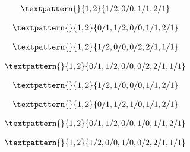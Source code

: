 \begin{equation}
	\begin{gathered}
		\textpattern{}{1,2}{1/2,0/0,1/1,2/1}
	\end{gathered}
	\label{cls:55}
\end{equation}

\begin{equation}
	\begin{gathered}
		\textpattern{}{1,2}{0/1,1/2,0/0,1/1,2/1}
	\end{gathered}
	\label{cls:56}
\end{equation}

\begin{equation}
	\begin{gathered}
		\textpattern{}{1,2}{1/2,0/0,0/2,2/1,1/1}
	\end{gathered}
	\label{cls:57}
\end{equation}

\begin{equation}
	\begin{gathered}
		\textpattern{}{1,2}{0/1,1/2,0/0,0/2,2/1,1/1}
	\end{gathered}
	\label{cls:58}
\end{equation}

\begin{equation}
	\begin{gathered}
		\textpattern{}{1,2}{1/2,1/0,0/0,1/1,2/1}
	\end{gathered}
	\label{cls:59}
\end{equation}

\begin{equation}
	\begin{gathered}
		\textpattern{}{1,2}{0/1,1/2,1/0,1/1,2/1}
	\end{gathered}
	\label{cls:60}
\end{equation}

\begin{equation}
	\begin{gathered}
		\textpattern{}{1,2}{0/1,1/2,0/0,1/0,1/1,2/1}
	\end{gathered}
	\label{cls:61}
\end{equation}

\begin{equation}
	\begin{gathered}
		\textpattern{}{1,2}{1/2,0/0,1/0,0/2,2/1,1/1}
	\end{gathered}
	\label{cls:62}
\end{equation}

